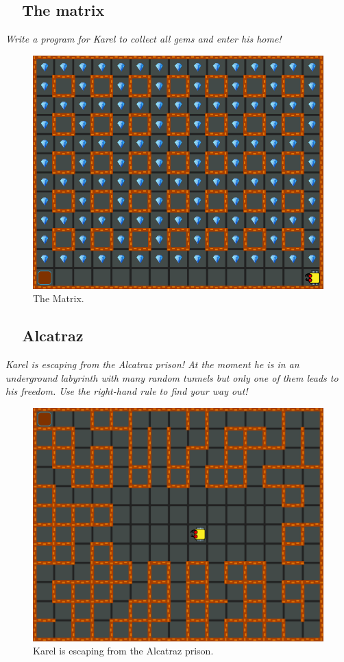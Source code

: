 {{\subsection{\ \ The matrix}

{\em Write a program for Karel to collect all gems and enter his home!}

\begin{figure}[!ht]
\begin{center}
\includegraphics[height=0.4\textwidth]{img/f11.png}
\end{center}
\vspace{-4mm}
\caption{The Matrix.}
\label{fig:f11}
\end{figure}
\vspace{-1cm}



\subsection{\ \ Alcatraz}

{\em Karel is escaping from the Alcatraz prison! At the moment he is in an underground labyrinth with many random tunnels but only one of them leads to his freedom. Use the right-hand rule to find your way out!}


\begin{figure}[!ht]
\begin{center}
\includegraphics[height=0.4\textwidth]{img/f12.png}
\end{center}
\vspace{-4mm}
\caption{Karel is escaping from the Alcatraz prison.}
\label{fig:f12}
\vspace{-1cm}
\end{figure}
\newpage


}}

